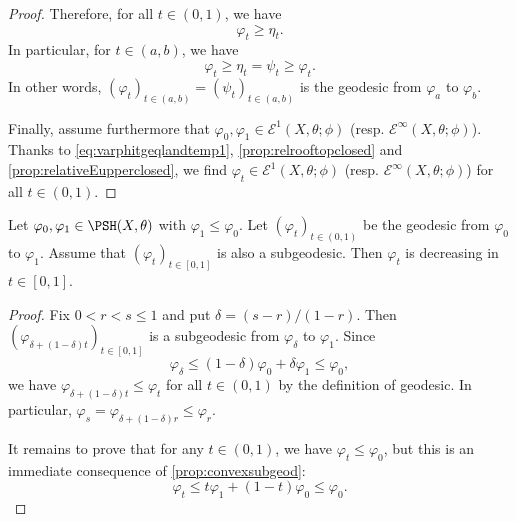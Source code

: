 \begin{proof}
    Therefore, for all $t\in (0,1)$, we have
    \[
    \varphi_t\geq \eta_t.
    \]
    In particular, for $t\in (a,b)$, we have
    \[
    \varphi_t\geq \eta_t=\psi_t\geq \varphi_t.
    \]
    In other words, $(\varphi_t)_{t\in (a,b)}=(\psi_t)_{t\in (a,b)}$ is the geodesic from $\varphi_a$ to $\varphi_b$.

    Finally, assume furthermore that $\varphi_0,\varphi_1\in \mathcal{E}^1(X,\theta;\phi)$ (resp. $\mathcal{E}^{\infty}(X,\theta;\phi)$). Thanks to \eqref{eq:varphitgeqlandtemp1}, \cref{prop:relrooftopclosed} and \cref{prop:relativeEupperclosed}, we find $\varphi_t\in \mathcal{E}^1(X,\theta;\phi)$ (resp. $\mathcal{E}^{\infty}(X,\theta;\phi)$) for all $t\in (0,1)$.
\end{proof}

\begin{lemma}\label{lma:geoddecreasing}
    Let $\varphi_0,\varphi_1\in \PSH(X,\theta)$ with $\varphi_1\leq \varphi_0$. Let $(\varphi_t)_{t\in (0,1)}$ be the geodesic from $\varphi_0$ to $\varphi_1$. Assume that $(\varphi_t)_{t\in [0,1]}$ is also a subgeodesic. Then $\varphi_t$ is decreasing in $t\in [0,1]$.
\end{lemma}
\begin{proof}
    Fix $0< r<s\leq 1$ and put $\delta=(s-r)/(1-r)$. Then $(\varphi_{\delta+(1-\delta)t})_{t\in [0,1]}$ is a subgeodesic from $\varphi_\delta$ to $\varphi_1$. Since
    \[
    \varphi_\delta\leq (1-\delta)\varphi_0+\delta\varphi_1\leq \varphi_0,
    \]
    we have $\varphi_{\delta+(1-\delta)t}\leq \varphi_t$ for all $t\in (0,1)$ by the definition of geodesic. In particular, $\varphi_s=\varphi_{\delta+(1-\delta)r}\leq \varphi_r$.

    It remains to prove that for any $t\in (0,1)$, we have $\varphi_t\leq \varphi_0$, but this is an immediate consequence of \cref{prop:convexsubgeod}:
    \[
        \varphi_t\leq t\varphi_1+(1-t)\varphi_0\leq \varphi_0.
    \]
\end{proof}




